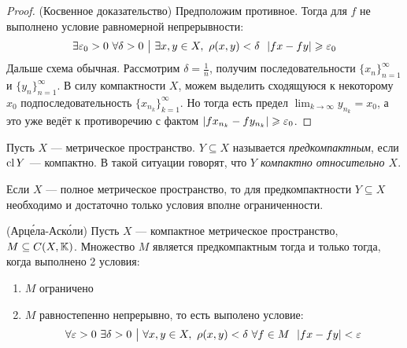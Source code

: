 \begin{proof} (Косвенное доказательство)
	Предположим противное. Тогда для $f$ не выполнено условие равномерной непрерывности:
	\[
		\exists \varepsilon_0 > 0\ \forall \delta > 0 \ \big|\  \exists x, y \in X,\ \rho(x, y) < \delta\ \ |fx - fy| \geqslant \varepsilon_0
	\]
	Дальше схема обычная. Рассмотрим $\delta = \frac{1}{n}$, получим последовательности $\{x_n\}_{n = 1}^\infty$ и $\{y_n\}_{n = 1}^\infty$. В силу компактности $X$, можем выделить сходящуюся к некоторому $x_0$ подпоследовательность $\{x_{n_k}\}_{k = 1}^\infty$. Но тогда есть предел $\lim_{k \to \infty} y_{n_k} = x_0$, а это уже ведёт к противоречию с фактом $|fx_{n_k} - fy_{n_k}| \geqslant \varepsilon_0$.
\end{proof}

\begin{definition}
	Пусть $X$ --- метрическое пространство. $Y \subseteq X$ называется \textit{предкомпактным}, если $\operatorname{cl} Y$ --- компактно. В такой ситуации говорят, что \textit{$Y$ компактно относительно $X$}.
\end{definition}

\begin{exercise}
	Если $X$ --- полное метрическое пространство, то для предкомпактности $Y \subseteq X$ необходимо и достаточно только условия вполне ограниченности.
\end{exercise}

\begin{theorem} (Арц\'{е}ла-Аск\'{о}ли)
	Пусть $X$ --- компактное метрическое пространство, $M \subseteq C(X, \mathbb{K})$. Множество $M$ является предкомпактным тогда и только тогда, когда выполнено 2 условия:
	\begin{enumerate}
		\item $M$ ограничено
		
		\item $M$ равностепенно непрерывно, то есть выполено условие:
		\[
			\forall \varepsilon > 0\ \exists \delta >0 \ \big|\  \forall x, y \in X,\ \rho(x, y) < \delta\ \forall f \in M\ \ |fx - fy| < \varepsilon
		\] 
	\end{enumerate}
\end{theorem}

